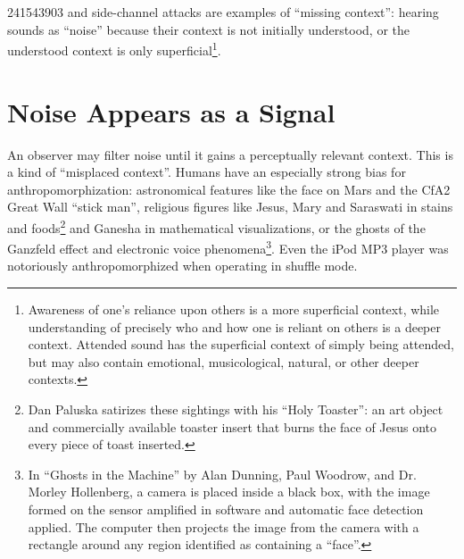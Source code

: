 \documentclass{thesis}
\begin{document}
241543903 and side-channel attacks are examples of ``missing context'': hearing sounds as ``noise'' because their context is not initially understood, or the understood context is only superficial\footnote{Awareness of one's reliance upon others is a more superficial context, while understanding of precisely who and how one is reliant on others is a deeper context. Attended sound has the superficial context of simply being attended, but may also contain emotional, musicological, natural, or other deeper contexts.}.

\section{Noise Appears as a Signal}

An observer may filter noise until it gains a perceptually relevant context. This is a kind of ``misplaced context''. Humans have an especially strong bias for anthropomorphization: astronomical features like the face on Mars\cite{brian_dunning_facemars_2008} and the CfA2 Great Wall ``stick man''\cite{de_lapparent_slice_1986}, religious figures like Jesus, Mary and Saraswati in stains and foods\cite{boston.com_religious_????}\footnote{Dan Paluska satirizes these sightings with his ``Holy Toaster''\cite{dan_paluska_holy_2005}: an art object and commercially available toaster insert that burns the face of Jesus onto every piece of toast inserted.} and Ganesha in mathematical visualizations\cite{melinda_green_buddhabrot_1993}, or the ghosts of the Ganzfeld effect and electronic voice phenomena\footnote{In ``Ghosts in the Machine'' by Alan Dunning, Paul Woodrow, and Dr. Morley Hollenberg\cite{alan_dunning_paul_woodrow_and_morley_hollenberg_einsteins_2008}, a camera is placed inside a black box, with the image formed on the sensor amplified in software and automatic face detection applied. The computer then projects the image from the camera with a rectangle around any region identified as containing a ``face''.}. Even the iPod MP3 player was notoriously anthropomorphized when operating in shuffle mode.\cite{rachel_dodes_tuneshard_2004}
\end{document}

